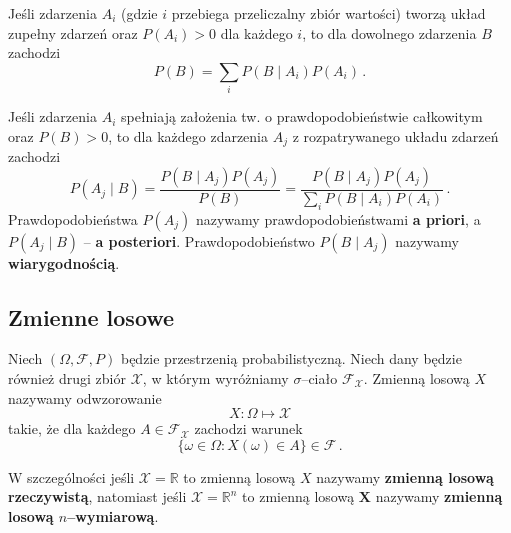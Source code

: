 \documentclass{myclass}
\numberwithin{equation}{subsection}
\begin{document}
\begin{theorem}
Jeśli zdarzenia \(A_i\) (gdzie \(i\) przebiega przeliczalny zbiór wartości) tworzą układ zupełny
zdarzeń oraz \(P(A_i) > 0\) dla każdego \(i\), to dla dowolnego zdarzenia \(B\) zachodzi
\begin{equation*}
    P(B) = \sum_{i} P(B \mid A_i) P(A_i)\,.
\end{equation*}
\end{theorem}

\begin{theorem}[Bayesa]
Jeśli zdarzenia \(A_i\) spełniają założenia tw. o prawdopodobieństwie całkowitym oraz \(P(B) > 0\),
to dla każdego zdarzenia \(A_j\) z rozpatrywanego układu zdarzeń zachodzi
\begin{equation*}
    P(A_j \mid B) = \frac{P(B \mid A_j) P(A_j)}{P(B)} = \frac{P(B \mid A_j) P(A_j)}{\sum_{i} P(B \mid A_i) P(A_i)}\,.
\end{equation*}
Prawdopodobieństwa \(P(A_j)\) nazywamy prawdopodobieństwami \textbf{a priori}, a \(P(A_j \mid
B)\) -- \textbf{a posteriori}. Prawdopodobieństwo \(P(B \mid A_j)\) nazywamy
\textbf{wiarygodnością}.   
\end{theorem}


\subsection{Zmienne losowe}

\begin{definition}
Niech \((\Omega, \mathcal{F}, P)\) będzie przestrzenią probabilistyczną. Niech dany będzie również
drugi zbiór \(\mathcal{X}\), w którym wyróżniamy \(\sigma\)--ciało \(\mathcal{F}_\mathcal{X}\).
Zmienną losową \(X\) nazywamy odwzorowanie
\begin{equation*}
    X: \Omega \mapsto \mathcal{X}
\end{equation*}
takie, że dla każdego \(A \in \mathcal{F}_\mathcal{X}\) zachodzi warunek
\begin{equation*}
    \{\omega \in \Omega : X(\omega) \in A \} \in \mathcal{F}\,.
\end{equation*}
\end{definition}

W szczególności jeśli \(\mathcal{X} = \mathbb{R}\) to zmienną losową \(X\) nazywamy
\textbf{zmienną losową rzeczywistą}, natomiast jeśli \(\mathcal{X} = \mathbb{R}^n\) to zmienną
losową \(\mathbf{X}\) nazywamy \textbf{zmienną losową \(n\)--wymiarową}.
\end{document}
